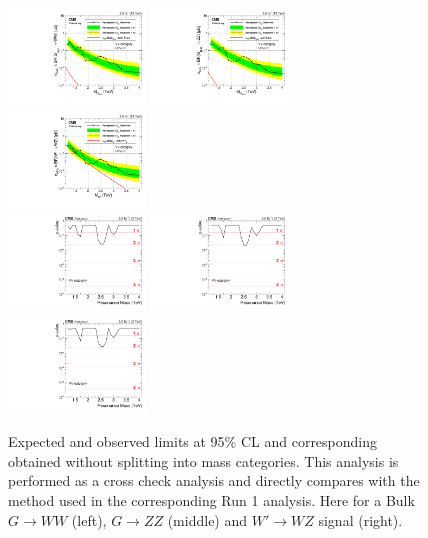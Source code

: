 \begin{figure}[h!]
\centering
\includegraphics[width=0.327\textwidth]{figures/analysis/search1/AN-15-211/limits/brazilianFlag_BulkWW_old_combined_13TeV_wPDF.pdf}
\includegraphics[width=0.327\textwidth]{figures/analysis/search1/AN-15-211/limits/brazilianFlag_BulkZZ_old_combined_13TeV_wPDF.pdf}
\includegraphics[width=0.327\textwidth]{figures/analysis/search1/AN-15-211/limits/brazilianFlag_WZ_old_combined_13TeV_wPDF.pdf}\\
\includegraphics[width=0.327\textwidth]{figures/analysis/search1/AN-15-211/pvalues/pvalue_BulkWWin_combined_old.pdf}
\includegraphics[width=0.327\textwidth]{figures/analysis/search1/AN-15-211/pvalues/pvalue_BulkZZin_combined_old.pdf}
\includegraphics[width=0.327\textwidth]{figures/analysis/search1/AN-15-211/pvalues/pvalue_WZin_combined_old.pdf}
\caption{Expected and observed limits at 95\% CL and corresponding obtained without splitting into mass categories. This analysis is performed as a cross check analysis and directly compares with the method used in the corresponding Run 1 analysis.  Here for a Bulk $G\rightarrow WW$ (left), $G\rightarrow ZZ$ (middle) and $W'\rightarrow WZ$ signal (right).}
\label{fig:app:Limits_CombOld}
\end{figure}
